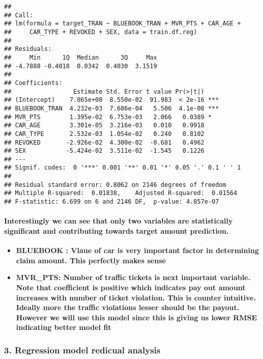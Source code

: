 \documentclass[]{article}
\providecommand{\tightlist}{%
  \setlength{\itemsep}{0pt}\setlength{\parskip}{0pt}}
\let\oldparagraph\paragraph
\renewcommand{\paragraph}[1]{\oldparagraph{#1}\mbox{}}
\begin{document}
\begin{verbatim}
## 
## Call:
## lm(formula = target_TRAN ~ BLUEBOOK_TRAN + MVR_PTS + CAR_AGE + 
##     CAR_TYPE + REVOKED + SEX, data = train.df.reg)
## 
## Residuals:
##     Min      1Q  Median      3Q     Max 
## -4.7888 -0.4018  0.0342  0.4030  3.1519 
## 
## Coefficients:
##                 Estimate Std. Error t value Pr(>|t|)    
## (Intercept)    7.865e+00  8.550e-02  91.983  < 2e-16 ***
## BLUEBOOK_TRAN  4.232e-03  7.686e-04   5.506  4.1e-08 ***
## MVR_PTS        1.395e-02  6.753e-03   2.066   0.0389 *  
## CAR_AGE        3.301e-05  3.216e-03   0.010   0.9918    
## CAR_TYPE       2.532e-03  1.054e-02   0.240   0.8102    
## REVOKED       -2.926e-02  4.300e-02  -0.681   0.4962    
## SEX           -5.424e-02  3.511e-02  -1.545   0.1226    
## ---
## Signif. codes:  0 '***' 0.001 '**' 0.01 '*' 0.05 '.' 0.1 ' ' 1
## 
## Residual standard error: 0.8062 on 2146 degrees of freedom
## Multiple R-squared:  0.01838,    Adjusted R-squared:  0.01564 
## F-statistic: 6.699 on 6 and 2146 DF,  p-value: 4.857e-07
\end{verbatim}

\hypertarget{interestingly-we-can-see-that-only-two-variables-are-statistically-significant-and-contributing-towards-target-amount-prediction.}{%
\paragraph{Interestingly we can see that only two variables are
statistically significant and contributing towards target amount
prediction.}\label{interestingly-we-can-see-that-only-two-variables-are-statistically-significant-and-contributing-towards-target-amount-prediction.}}

\begin{itemize}
\tightlist
\item
  \textbf{BLUEBOOK : Vlaue of car is very important factor in
  determining claim amount. This perfectly makes sense}
\item
  \textbf{MVR\_PTS: Number of traffic tickets is next important
  variable. Note that coefficient is positive which indicates pay out
  amount increases with number of ticket violation. This is counter
  intuitive. Ideally more the traffic violations lesser should be the
  payout. However we will use this model since this is giving us lower
  RMSE indicating better model fit}
\end{itemize}

\hypertarget{regression-model-redicual-analysis}{%
\subsubsection{\texorpdfstring{\textbf{3. Regression model redicual
analysis}}{3. Regression model redicual analysis}}\label{regression-model-redicual-analysis}}
\end{document}
